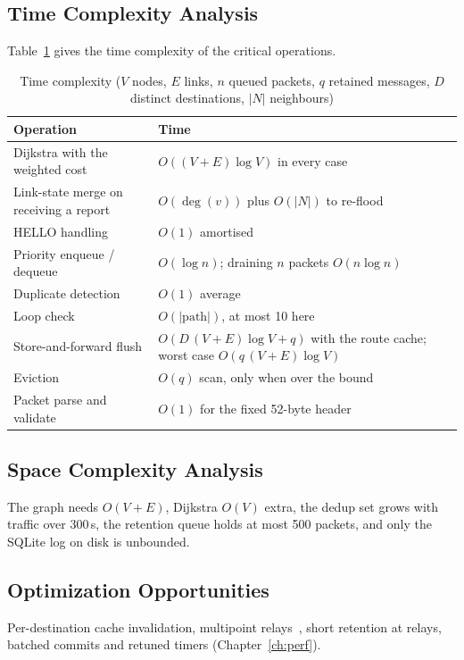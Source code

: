 \subsection{Time Complexity Analysis}
Table~\ref{tab:complexity} gives the time complexity of the critical operations.
\begin{table}[!htbp]
\caption[Time complexity of the critical operations]{Time complexity ($V$ nodes, $E$ links, $n$ queued packets, $q$ retained messages, $D$ distinct destinations, $|N|$ neighbours)}
\label{tab:complexity}
\footnotesize
\begin{tabularx}{\textwidth}{@{}>{\raggedright\arraybackslash}p{6.4cm}>{\raggedright\arraybackslash}X@{}}
\toprule
\textbf{Operation} & \textbf{Time}\\ \midrule
Dijkstra with the weighted cost & $O((V+E)\log V)$ in every case\\
Link-state merge on receiving a report & $O(\deg(v))$ plus $O(|N|)$ to re-flood\\
HELLO handling & $O(1)$ amortised\\
Priority enqueue / dequeue & $O(\log n)$; draining $n$ packets $O(n\log n)$\\
Duplicate detection & $O(1)$ average\\
Loop check & $O(|\text{path}|)$, at most 10 here\\
Store-and-forward flush & $O(D\,(V+E)\log V+q)$ with the route cache; worst case $O(q\,(V+E)\log V)$\\
Eviction & $O(q)$ scan, only when over the bound\\
Packet parse and validate & $O(1)$ for the fixed 52-byte header\\
\bottomrule
\end{tabularx}
\end{table}

\subsection{Space Complexity Analysis}
The graph needs $O(V+E)$, Dijkstra $O(V)$ extra, the dedup set grows with traffic over 300\,s, the retention queue holds at most 500 packets, and only the SQLite log on disk is unbounded.
\subsection{Optimization Opportunities}
\label{sec:opt}
Per-destination cache invalidation, multipoint relays~\cite{rfc3626olsr}, short retention at relays, batched commits and retuned timers (Chapter~\ref{ch:perf}).
